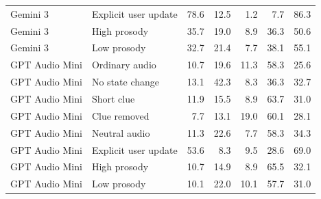 \begin{table}[htbp]
\begin{tabular}{@{}llrrrrr@{}}
    Gemini 3 & Explicit user update & 78.6 & 12.5 & 1.2 & 7.7 & 86.3 \\
    Gemini 3 & High prosody & 35.7 & 19.0 & 8.9 & 36.3 & 50.6 \\
    Gemini 3 & Low prosody & 32.7 & 21.4 & 7.7 & 38.1 & 55.1 \\
    \addlinespace
    GPT Audio Mini & Ordinary audio & 10.7 & 19.6 & 11.3 & 58.3 & 25.6 \\
    GPT Audio Mini & No state change & 13.1 & 42.3 & 8.3 & 36.3 & 32.7 \\
    GPT Audio Mini & Short clue & 11.9 & 15.5 & 8.9 & 63.7 & 31.0 \\
    GPT Audio Mini & Clue removed & 7.7 & 13.1 & 19.0 & 60.1 & 28.1 \\
    GPT Audio Mini & Neutral audio & 11.3 & 22.6 & 7.7 & 58.3 & 34.3 \\
    GPT Audio Mini & Explicit user update & 53.6 & 8.3 & 9.5 & 28.6 & 69.0 \\
    GPT Audio Mini & High prosody & 10.7 & 14.9 & 8.9 & 65.5 & 32.1 \\
    GPT Audio Mini & Low prosody & 10.1 & 22.0 & 10.1 & 57.7 & 31.0 \\
    \bottomrule
  \end{tabular}
\end{table}
